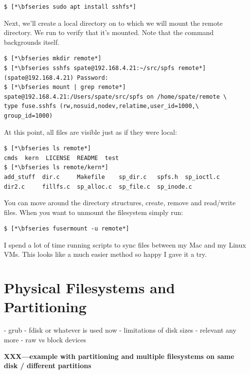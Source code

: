 \begin{lstlisting}
$ [*\bfseries sudo apt install sshfs*]
\end{lstlisting}

\noindent
Next, we'll create a local directory on to which we will mount the remote directory. We run  to verify that it's mounted. Note that the  command backgrounds itself.

\begin{lstlisting}
$ [*\bfseries mkdir remote*]
$ [*\bfseries sshfs spate@192.168.4.21:~/src/spfs remote*]
(spate@192.168.4.21) Password:
$ [*\bfseries mount | grep remote*]
spate@192.168.4.21:/Users/spate/src/spfs on /home/spate/remote \
type fuse.sshfs (rw,nosuid,nodev,relatime,user_id=1000,\
group_id=1000)
\end{lstlisting}

\noindent
At this point, all files are visible just as if they were local:

\begin{lstlisting}
$ [*\bfseries ls remote*]
cmds  kern  LICENSE  README  test
$ [*\bfseries ls remote/kern*]
add_stuff  dir.c     Makefile    sp_dir.c   spfs.h  sp_ioctl.c
dir2.c     fillfs.c  sp_alloc.c  sp_file.c  sp_inode.c
\end{lstlisting}

\noindent
You can move around the directory structures, create, remove and read/write files. When you want to unmount the filesystem simply run:

\begin{lstlisting}
$ [*\bfseries fusermount -u remote*]
\end{lstlisting}

\noindent
I spend a lot of time running scripts to sync files between my Mac and my Linux VMs. This looks like a much easier method so happy I gave it a try.


\section{Physical Filesystems and Partitioning}\label{mkfs-examples}

- grub
- fdisk or whatever is used now
- limitations of disk sizes - relevant any more
- raw vs block devices

\textbf{XXX---example with partitioning and multiple filesystems on same disk / different partitions}

